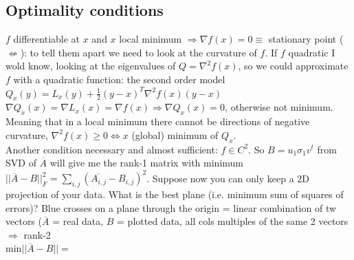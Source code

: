 \documentclass[10pt]{report}
\begin{document}
\subsection{Optimality conditions}
$f$ differentiable at $x$ and $x$ local minimum $\Rightarrow \nabla f(x) = 0 \equiv$ stationary point ($\not\Leftarrow$): to tell them apart we need to look at the curvature of $f$. If $f$ quadratic I wold know, looking at the eigenvalues of $Q = \nabla^2 f(x)$, so we could approximate $f$ with a quadratic function: the second order model $Q_x(y) = L_x(y) + \frac{1}{2}(y-x)^T\nabla^2f(x)(y-x)$\\
$\nabla Q_x(x) = \nabla L_x(x) = \nabla f(x) \Rightarrow \nabla Q_x(x) = 0$, otherwise not minimum. Meaning that in a local minimum there cannot be directions of negative curvature, $\nabla^2 f(x) \geq 0 \Leftrightarrow x$ (global) minimum of $Q_x$.\\
Another condition necessary and almost sufficient: $f\in C^2$.
So $B=u_1\sigma_1 v^t$ from SVD of $\overline{A}$ will give me the rank-1 matrix with minimum $||\overline{A}-B||_F^2 = \sum_{i,j}(\overline{A_{i,j}} - B_{i,j})^2$. Suppose now you can only keep a 2D projection of your data. What is the best plane (i.e. minimum sum of squares of errors)? Blue crosses on a plane through the origin = linear combination of tw vectors ($\overline{A}$ = real data, $B$ = plotted data, all cols multiples of the same 2 vectors $\Rightarrow$ rank-2\\
min$||\overline{A}-B|| = $

\end{document}
